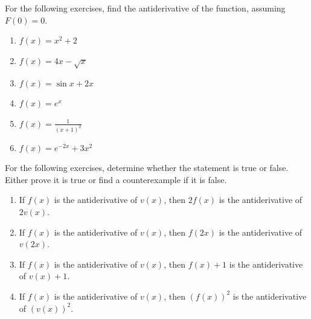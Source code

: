 \documentclass{exercises}
\begin{document}
For the following exercises, find the antiderivative of the function, assuming $F(0)=0$.

\begin{enumerate}[resume]
\item \techrequired $f(x)=x^{2}+2$
\item \techrequired $f(x)=4x-\sqrt{x}$
\item \techrequired $f(x)=\sin x+2x$
\item \techrequired $f(x)=e^{x}$
\item \techrequired $f(x)=\frac{1}{{(x+1)}^{2}}$
\item \techrequired $f(x)=e^{-2x}+3x^{2}$
\end{enumerate}

For the following exercises, determine whether the statement is true or false. Either prove it is true or find a counterexample if it is false.

\begin{enumerate}[resume]
\item If $f(x)$ is the antiderivative of $v(x)$, then $2f(x)$ is the antiderivative of $2v(x)$.
\item If $f(x)$ is the antiderivative of $v(x)$, then $f(2x)$ is the antiderivative of $v(2x)$.
\item If $f(x)$ is the antiderivative of $v(x)$, then $f(x)+1$ is the antiderivative of $v(x)+1$.
\item If $f(x)$ is the antiderivative of $v(x)$, then ${(f(x))}^{2}$ is the antiderivative of ${(v(x))}^{2}$.
\end{enumerate}
\end{document}
